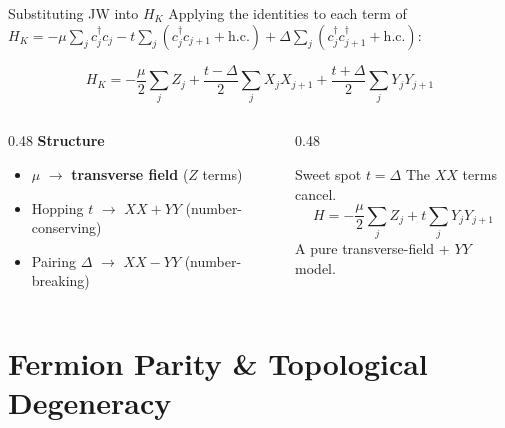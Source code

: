 \documentclass[aspectratio=169, 12pt]{beamer}
\newcommand{\cdag}{c^{\dagger}}
\begin{document}
\begin{frame}{Substituting JW into $H_K$}
  Applying the identities to each term of
  $H_K = -\mu\sum_j\cdag_j c_j
         -t\sum_j(\cdag_j c_{j+1}+\mathrm{h.c.})
         +\Delta\sum_j(\cdag_j\cdag_{j+1}+\mathrm{h.c.})$:

  \vspace{-0.5em}
  \begin{equation}
    \boxed{
    H_K = -\frac{\mu}{2}\sum_j Z_j
          + \frac{t-\Delta}{2}\sum_j X_j X_{j+1}
          + \frac{t+\Delta}{2}\sum_j Y_j Y_{j+1}
    }
  \end{equation}

  \vspace{-0.5em}
  \begin{columns}[T]
    \begin{column}{0.48\textwidth}
      \textbf{Structure}
      \begin{itemize}
        \item $\mu$ $\to$ \textbf{transverse field} ($Z$ terms)
        \item Hopping $t$ $\to$ $XX+YY$ (number-conserving)
        \item Pairing $\Delta$ $\to$ $XX-YY$ (number-breaking)
      \end{itemize}
    \end{column}
    \begin{column}{0.48\textwidth}
      \begin{block}{Sweet spot $t = \Delta$}
        The $XX$ terms cancel.
        \[
          H = -\frac{\mu}{2}\sum_j Z_j + t\sum_j Y_j Y_{j+1}
        \]
        A pure transverse-field + $YY$ model.
      \end{block}
    \end{column}
  \end{columns}
\end{frame}

\section{Fermion Parity \& Topological Degeneracy}
\end{document}
